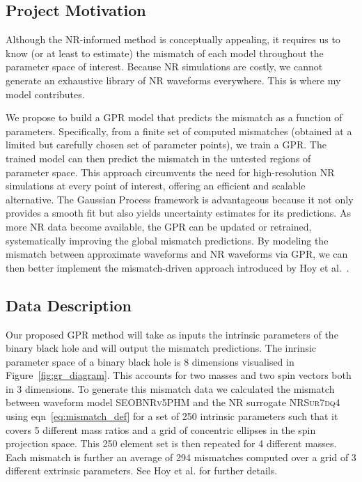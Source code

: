 \documentclass[12pt]{article}
\begin{document}
\subsection{Project Motivation}
Although the NR-informed method is conceptually appealing, it requires us to know (or at least to estimate) 
the mismatch of each model throughout the parameter space of interest. Because
NR simulations are costly, we cannot generate an exhaustive library of NR waveforms
everywhere. This is where my model contributes.
%
%

We propose to build a GPR model that predicts the mismatch as a function of parameters. Specifically, from a finite set of computed mismatches (obtained at a limited but carefully chosen set of parameter points), we train a GPR.
The trained model can then predict the mismatch in the untested regions of parameter space. This approach circumvents the need for high-resolution NR simulations at every point of interest,
offering an efficient and scalable alternative. The Gaussian Process framework is advantageous because it not only provides a smooth fit but also yields uncertainty estimates for its predictions.
As more NR data become available, the GPR can be updated or retrained, systematically improving the global mismatch predictions.
By modeling the mismatch between approximate waveforms and NR waveforms via GPR, we can then better implement the mismatch-driven approach introduced by Hoy et al.~\cite{Ogpaper}. 

\subsection{Data Description}
\label{sec:data_description}
Our proposed GPR method will take as inputs the intrinsic parameters of the binary black hole and will output the mismatch predictions.
The inrinsic parameter space of a binary black hole is 8 dimensions visualised in Figure~\ref{fig:gr_diagram}. This accounts for two masses and two spin vectors both in 3 dimensions. 
To generate this mismatch data we calculated the mismatch between waveform model \textsc{SEOBNRv5PHM} \cite{bestNRfitS} and the NR surrogate \textsc{NRSur7dq4} \cite{NRsurrogate} using eqn~\eqref{eq:mismatch_def} for a set of 250 intrinsic parameters 
such that it covers 5 different mass ratios and a grid of concentric ellipses in the spin projection space.
This 250 element set is then repeated for 4 different masses.
Each mismatch is further an average of 294 mismatches computed over a grid of 3 different extrinsic parameters.
See Hoy et al. for further details.
%
\end{document}
